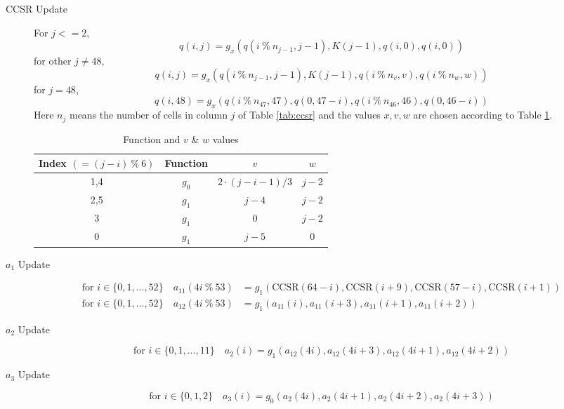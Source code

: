 \documentclass[a4paper,10pt]{article}
\begin{document}
\begin{description}
    \item[CCSR Update]  For $j <= 2$,
    \begin{equation}
        q(i,j) = g_x(q(i \ \%\ n_{j-1}, j-1), K(j-1), q(i, 0), q(i, 0))
    \end{equation}
    for other $j \neq 48$,
    \begin{equation}
        q(i,j) = g_x(q(i \ \%\ n_{j-1}, j-1), K(j-1), q(i \ \%\ n_{v}, v), q(i \ \%\ n_{w}, w))
    \end{equation}
    for $j = 48$,
    \begin{equation}
        q(i,48) = g_x(q(i \ \%\ n_{47}, 47), q(0, 47 -i), q(i \ \%\ n_{46}, 46), q(0, 46 -i))
    \end{equation}
    Here $n_{j}$ means the number of cells in column $j$ of Table \ref{tab:ccsr} and the values $x, v, w$ are chosen according to Table \ref{tab:xvw}.

\begin{table}[h]
\centering
\begin{tabular}{cccc}
Index $(=(j-i)\ \% \ 6)$ & Function & $v$             & $w$     \\\hline
1,4   & $g_0$    & $2\cdot(j-i-1)/3$ & $j-2$ \\
2,5   & $g_1$    & $j-4$         & $j-2$ \\
3     & $g_1$    & 0             & $j-2$ \\
0     & $g_1$    & $j-5$         & 0    
\end{tabular}
\caption{Function and $v$ \& $w$ values}
\label{tab:xvw}
\end{table}
    \item[$a_{1}$ Update]
    \begin{equation}
        \begin{aligned}
            \text{for } i \in \{0,1,\ldots,52\} \quad a_{11}(4i \ \%\ 53) &= g_1(\text{CCSR}(64-i), \text{CCSR}(i+9), \text{CCSR}(57-i), \text{CCSR}(i+1))\\
            \text{for } i \in \{0,1,\ldots,52\} \quad a_{12}(4i \ \%\ 53) &= g_1(a_{11}(i), a_{11}(i+3), a_{11}(i+1), a_{11}(i+2))
        \end{aligned}
    \end{equation}
    \item[$a_{2}$ Update]
    \begin{equation}
            \text{for } i \in \{0,1,\ldots,11\} \quad a_{2}(i) = g_1(a_{12}(4i), a_{12}(4i+3), a_{12}(4i+1), a_{12}(4i+2))
    \end{equation}
    \item[$a_{3}$ Update]
    \begin{equation}
            \text{for } i \in \{0,1,2\} \quad a_{3}(i) = g_0(a_{2}(4i), a_{2}(4i+1), a_{2}(4i+2), a_{2}(4i+3))
    \end{equation}
\end{description}
\end{document}
